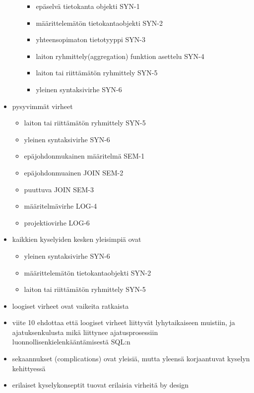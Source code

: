 \begin{itemize}
\begin{itemize}
        \begin{itemize}
            \item epäselvä tietokanta objekti SYN-1
            \item määrittelemätön tietokantaobjekti SYN-2
            \item yhteensopimaton tietotyyppi SYN-3
            \item laiton ryhmittely(aggregation) funktion asettelu SYN-4
            \item laiton tai riittämätön ryhmittely SYN-5
            \item yleinen syntaksivirhe SYN-6
        \end{itemize}
    \end{itemize}
    \item pysyvimmät virheet
    \begin{itemize}
        \item laiton tai riittämätön ryhmittely SYN-5
        \item yleinen syntaksivirhe SYN-6
        \item epäjohdonmukainen määritelmä SEM-1
        \item epäjohdonmuainen JOIN SEM-2
        \item puuttuva JOIN SEM-3
        \item määritelmävirhe LOG-4
        \item projektiovirhe LOG-6
    \end{itemize}
    \item kaikkien kyselyiden kesken yleisimpiä ovat
    \begin{itemize}
        \item yleinen syntaksivirhe SYN-6
        \item määrittelemätön tietokantaobjekti SYN-2
        \item laiton tai riittämätön ryhmittely SYN-5
    \end{itemize}
    \item loogiset virheet ovat vaikeita ratkaista
    \item viite 10 ehdottaa että loogiset virheet liittyvät lyhytaikaiseen muistiin, ja ajatuksenkulusta mikä liittynee ajatusprosessiin luonnollisenkielenkääntämisestä SQL:n
    \item sekaannukset (complications) ovat yleisiä, mutta yleensä korjaantuvat kyselyn kehittyessä
    \item erilaiset kyselykonseptit tuovat erilaisia virheitä by design
    \begin{itemize}

\end{itemize}
\end{itemize}
